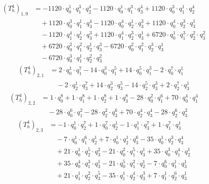 \begin{align*}(T_{h}^4)_{1,9}&=-1120\cdot q_0^{1}\cdot q_1^{3}\cdot q_2^{4}-1120\cdot q_0^{1}\cdot q_1^{3}\cdot q_3^{4}+1120\cdot q_0^{3}\cdot q_1^{1}\cdot q_2^{4}\\
&\quad +1120\cdot q_0^{3}\cdot q_1^{1}\cdot q_3^{4}-1120\cdot q_0^{4}\cdot q_2^{1}\cdot q_3^{3}+1120\cdot q_0^{4}\cdot q_2^{3}\cdot q_3^{1}\\
&\quad -1120\cdot q_1^{4}\cdot q_2^{1}\cdot q_3^{3}+1120\cdot q_1^{4}\cdot q_2^{3}\cdot q_3^{1}+6720\cdot q_0^{1}\cdot q_1^{3}\cdot q_2^{2}\cdot q_3^{2}\\
&\quad +6720\cdot q_0^{2}\cdot q_1^{2}\cdot q_2^{1}\cdot q_3^{3}-6720\cdot q_0^{2}\cdot q_1^{2}\cdot q_2^{3}\cdot q_3^{1}\\
&\quad -6720\cdot q_0^{3}\cdot q_1^{1}\cdot q_2^{2}\cdot q_3^{2}\end{align*}
\begin{align*}(T_{h}^4)_{2,1}&=2\cdot q_0^{1}\cdot q_1^{7}-14\cdot q_0^{3}\cdot q_1^{5}+14\cdot q_0^{5}\cdot q_1^{3}-2\cdot q_0^{7}\cdot q_1^{1}\\
&\quad -2\cdot q_2^{1}\cdot q_3^{7}+14\cdot q_2^{3}\cdot q_3^{5}-14\cdot q_2^{5}\cdot q_3^{3}+2\cdot q_2^{7}\cdot q_3^{1}\end{align*}
\begin{align*}(T_{h}^4)_{2,2}&=1\cdot q_0^{8}+1\cdot q_1^{8}+1\cdot q_2^{8}+1\cdot q_3^{8}-28\cdot q_0^{2}\cdot q_1^{6}+70\cdot q_0^{4}\cdot q_1^{4}\\
&\quad -28\cdot q_0^{6}\cdot q_1^{2}-28\cdot q_2^{2}\cdot q_3^{6}+70\cdot q_2^{4}\cdot q_3^{4}-28\cdot q_2^{6}\cdot q_3^{2}\end{align*}
\begin{align*}(T_{h}^4)_{2,3}&=-1\cdot q_0^{1}\cdot q_2^{7}+1\cdot q_0^{7}\cdot q_2^{1}-1\cdot q_1^{1}\cdot q_3^{7}+1\cdot q_1^{7}\cdot q_3^{1}\\
&\quad -7\cdot q_0^{1}\cdot q_1^{6}\cdot q_2^{1}+7\cdot q_0^{1}\cdot q_2^{1}\cdot q_3^{6}-35\cdot q_0^{1}\cdot q_2^{3}\cdot q_3^{4}\\
&\quad +21\cdot q_0^{1}\cdot q_2^{5}\cdot q_3^{2}-21\cdot q_0^{2}\cdot q_1^{5}\cdot q_3^{1}+35\cdot q_0^{3}\cdot q_1^{4}\cdot q_2^{1}\\
&\quad +35\cdot q_0^{4}\cdot q_1^{3}\cdot q_3^{1}-21\cdot q_0^{5}\cdot q_1^{2}\cdot q_2^{1}-7\cdot q_0^{6}\cdot q_1^{1}\cdot q_3^{1}\\
&\quad +21\cdot q_1^{1}\cdot q_2^{2}\cdot q_3^{5}-35\cdot q_1^{1}\cdot q_2^{4}\cdot q_3^{3}+7\cdot q_1^{1}\cdot q_2^{6}\cdot q_3^{1}\end{align*}

